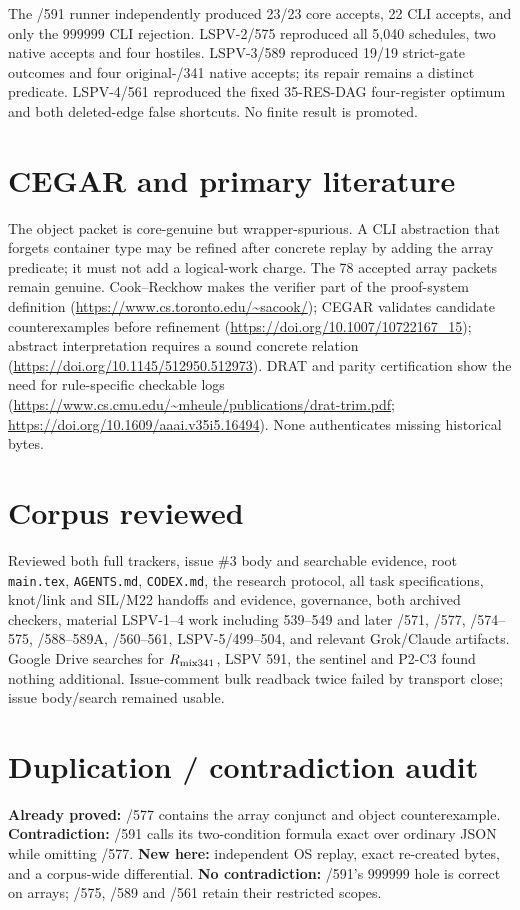 \documentclass[10pt]{article}
\begin{document}
The /591 runner independently produced 23/23 core accepts, 22 CLI accepts, and only the
\(999999\) CLI rejection.  LSPV-2/575 reproduced all 5,040 schedules, two native accepts and
four hostiles.  LSPV-3/589 reproduced 19/19 strict-gate outcomes and four original-/341 native
accepts; its repair remains a distinct predicate.  LSPV-4/561 reproduced the fixed 35-RES-DAG
four-register optimum and both deleted-edge false shortcuts.  No finite result is promoted.

\section*{CEGAR and primary literature}
The object packet is core-genuine but wrapper-spurious.  A CLI abstraction that forgets
container type may be refined after concrete replay by adding the array predicate; it must not
add a logical-work charge.  The 78 accepted array packets remain genuine.  Cook--Reckhow makes
the verifier part of the proof-system definition (\url{https://www.cs.toronto.edu/~sacook/});
CEGAR validates candidate counterexamples before refinement
(\url{https://doi.org/10.1007/10722167_15}); abstract interpretation requires a sound concrete
relation (\url{https://doi.org/10.1145/512950.512973}).  DRAT and parity certification show the
need for rule-specific checkable logs
(\url{https://www.cs.cmu.edu/~mheule/publications/drat-trim.pdf};
\url{https://doi.org/10.1609/aaai.v35i5.16494}).  None authenticates missing historical bytes.

\section*{Corpus reviewed}
Reviewed both full trackers, issue \#3 body and searchable evidence, root \texttt{main.tex},
\texttt{AGENTS.md}, \texttt{CODEX.md}, the research protocol, all task specifications,
knot/link and SIL/M22 handoffs and evidence, governance, both archived checkers, material
LSPV-1--4 work including 539--549 and later /571, /577, /574--575, /588--589A, /560--561,
LSPV-5/499--504, and relevant Grok/Claude artifacts.  Google Drive searches for
\(R_{\rm mix341}\), LSPV 591, the sentinel and P2-C3 found nothing additional.
Issue-comment bulk readback twice failed by transport close; issue body/search remained usable.

\section*{Duplication / contradiction audit}
\textbf{Already proved:} /577 contains the array conjunct and object counterexample.
\textbf{Contradiction:} /591 calls its two-condition formula exact over ordinary JSON while
omitting /577.  \textbf{New here:} independent OS replay, exact re-created bytes, and a
corpus-wide differential.  \textbf{No contradiction:} /591's \(999999\) hole is correct on
arrays; /575, /589 and /561 retain their restricted scopes.
\end{document}
